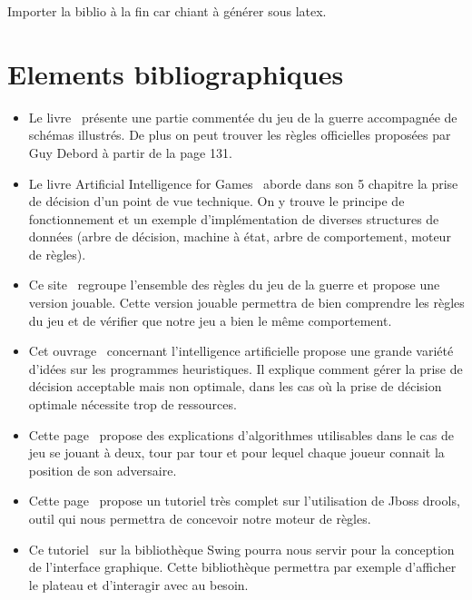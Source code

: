 \documentclass[12pt]{article}
\begin{document}
		Importer la biblio à la fin car chiant à générer sous latex.
		
		\clearpage

	\section{Elements bibliographiques}
	
		\begin{itemize}
		
		\item Le livre~\cite{ref1} présente une partie commentée du jeu de la guerre accompagnée de schémas illustrés. 
		De plus on peut trouver les règles officielles proposées par Guy Debord à partir de la page 131.
		\\[0.7\baselineskip]
		
		\item Le livre Artificial Intelligence for Games~\cite{ref2} aborde dans son 5 chapitre la prise de décision d'un point de vue technique. 
		On y trouve le principe de fonctionnement et un exemple d'implémentation de diverses structures de données (arbre de décision, machine à état, 
		arbre de comportement, moteur de règles).
		\\[0.7\baselineskip]

		\item Ce site~\cite{ref3} regroupe l'ensemble des règles du jeu de la guerre et propose une version jouable. Cette version jouable permettra 
		de bien comprendre les règles du jeu et de vérifier que notre jeu a bien le même comportement.
		\\[0.7\baselineskip]
	
		\item Cet ouvrage~\cite{ref4} concernant l'intelligence artificielle propose une grande variété d'idées sur les programmes heuristiques. 
		Il explique comment gérer la prise de décision acceptable mais non optimale, dans les cas où la prise de décision optimale nécessite trop de ressources.
		\\[0.7\baselineskip]
		
		\item Cette page~\cite{ref5} propose des explications d'algorithmes utilisables dans le cas de jeu se jouant à deux, tour par tour et 
		pour lequel chaque joueur connait la position de son adversaire.
		\\[0.7\baselineskip]
		
		\item Cette page~\cite{ref6} propose un tutoriel très complet sur l'utilisation de Jboss drools, outil qui nous permettra de concevoir notre moteur de règles.
		\\[0.7\baselineskip]
		
		\item Ce tutoriel~\cite{ref7} sur la bibliothèque Swing pourra nous servir pour la conception de l'interface graphique. Cette bibliothèque 
		permettra par exemple d'afficher le plateau et d'interagir avec au besoin.
		\\[0.7\baselineskip]
		
		\end{itemize}
		
		
		{}
\end{document}
